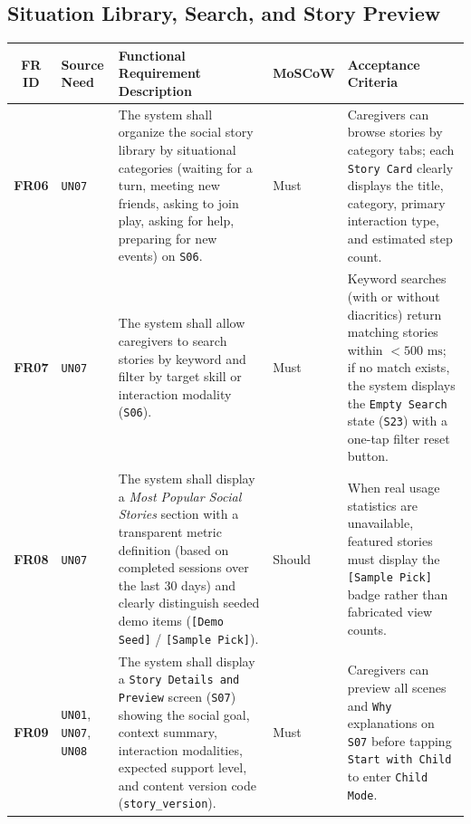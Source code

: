 \subsection{Situation Library, Search, and Story Preview}


\begin{footnotesize}
\noindent\begin{xltabular}{\textwidth}{|c|p{2.2cm}|X|p{2.0cm}|p{2.4cm}|}
\hline
\textbf{FR ID} & \textbf{Source Need} & \textbf{Functional Requirement Description} & \textbf{MoSCoW} & \textbf{Acceptance Criteria} \\ \hline
\endhead
\textbf{FR06} & \texttt{UN07} & The system shall organize the social story library by situational categories (waiting for a turn, meeting new friends, asking to join play, asking for help, preparing for new events) on \texttt{S06}. & Must & Caregivers can browse stories by category tabs; each \texttt{Story Card} clearly displays the title, category, primary interaction type, and estimated step count. \\ \hline
\textbf{FR07} & \texttt{UN07} & The system shall allow caregivers to search stories by keyword and filter by target skill or interaction modality (\texttt{S06}). & Must & Keyword searches (with or without diacritics) return matching stories within $< 500\text{ ms}$; if no match exists, the system displays the \texttt{Empty Search} state (\texttt{S23}) with a one-tap filter reset button. \\ \hline
\textbf{FR08} & \texttt{UN07} & The system shall display a \textit{Most Popular Social Stories} section with a transparent metric definition (based on completed sessions over the last 30 days) and clearly distinguish seeded demo items (\texttt{[Demo Seed]} / \texttt{[Sample Pick]}). & Should & When real usage statistics are unavailable, featured stories must display the \texttt{[Sample Pick]} badge rather than fabricated view counts. \\ \hline
\textbf{FR09} & \texttt{UN01}, \texttt{UN07}, \texttt{UN08} & The system shall display a \texttt{Story Details and Preview} screen (\texttt{S07}) showing the social goal, context summary, interaction modalities, expected support level, and content version code (\texttt{story\_version}). & Must & Caregivers can preview all scenes and \texttt{Why} explanations on \texttt{S07} before tapping \texttt{Start with Child} to enter \texttt{Child Mode}. \\ \hline
\end{xltabular}
\end{footnotesize}



